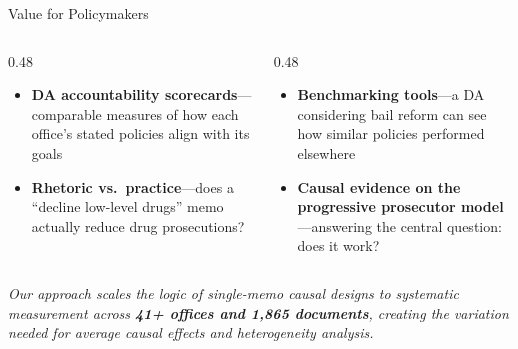 \documentclass[aspectratio=169, 11pt]{beamer}
\begin{document}
\begin{frame}{Value for Policymakers}
\begin{columns}[T]
\begin{column}{0.48\textwidth}
\begin{itemize}\setlength\itemsep{6pt}
    \item \textbf{DA accountability scorecards}---comparable measures of how each office's stated policies align with its goals
    \item \textbf{Rhetoric vs.\ practice}---does a ``decline low-level drugs'' memo actually reduce drug prosecutions?
\end{itemize}
\end{column}
\begin{column}{0.48\textwidth}
\begin{itemize}\setlength\itemsep{6pt}
    \item \textbf{Benchmarking tools}---a DA considering bail reform can see how similar policies performed elsewhere
    \item \textbf{Causal evidence on the progressive prosecutor model}---answering the central question: does it work?
\end{itemize}
\end{column}
\end{columns}
\vspace{8pt}
{\small\emph{Our approach scales the logic of single-memo causal designs to systematic measurement across \textbf{41+ offices and 1,865 documents}, creating the variation needed for average causal effects and heterogeneity analysis.}}
\end{frame}
\end{document}
